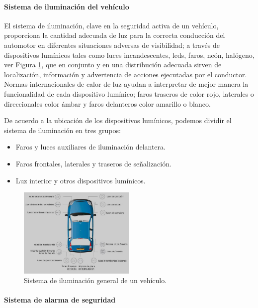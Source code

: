\paragraph{Sistema de iluminación del vehículo}

El sistema de iluminación, clave en la seguridad activa de un vehículo, proporciona la cantidad adecuada de luz para la correcta conducción del automotor en diferentes situaciones adversas de visibilidad; a través de dispositivos lumínicos tales como luces incandescentes, leds, faros, neón, halógeno, ver Figura \ref{Mcinco2}, que en conjunto y en una distribución adecuada sirven de localización, información y advertencia de acciones ejecutadas por el conductor.\\

Normas internacionales de calor de luz ayudan a interpretar de mejor manera la funcionalidad de cada dispositivo lumínico; faros traseros de color rojo, laterales o direccionales color ámbar y faros delanteros color amarillo o blanco.

De acuerdo a la ubicación de los dispositivos lumínicos, podemos dividir el sistema de iluminación en tres grupos:
\begin{itemize}
	\item
	Faros y luces auxiliares de iluminación delantera.
    	\item
	Faros frontales, laterales y traseros de señalización.
    	\item
	Luz interior y otros dispositivos lumínicos.
\end{itemize}
%
\begin{figure}[H]
\centering
\includegraphics[width=0.5\textwidth]{marco/fig6.jpg}
\caption{Sistema de iluminación general de un vehículo.}
\label{Mcinco2}
\end{figure}
%

\paragraph{Sistema de alarma de seguridad}

